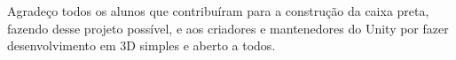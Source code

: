 Agradeço todos os alunos que contribuíram para a construção da caixa preta, fazendo desse projeto possível, e aos criadores e mantenedores do Unity por fazer desenvolvimento em 3D simples e aberto a todos.